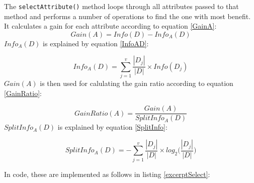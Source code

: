 \documentclass{article}
\begin{document}
    The \verb|selectAttribute()| method loops through all attributes passed to that method and performs a number of operations to find the one with most benefit. It calculates a gain for each attribute according to equation \ref{GainA}:
    \begin{equation} \label{GainA}
    Gain(A)=Info(D)-Info_A (D)
    \end{equation}
    $Info_A (D)$ is explained by equation \ref{InfoAD}:

    \begin{equation} \label{InfoAD}
    Info_A (D)=\sum_{j=1}^{v}\frac{|D_j|}{|D|}\times Info(D_j)
    \end{equation}
    $Gain(A)$ is then used for calulating the gain ratio according to equation \ref{GainRatio}:

    \begin{equation} \label{GainRatio}
    GainRatio(A)=\frac{Gain(A)}{SplitInfo_A (D)}
    \end{equation}
    $SplitInfo_A (D)$ is explained by equation \ref{SplitInfo}:

    \begin{equation} \label{SplitInfo}
    SplitInfo_A (D)=-\sum_{j=1}^{v}\frac{|D_j|}{|D|} \times log_2\bigg( \frac{|D_j|}{|D|}\bigg)
    \end{equation}

    In code, these are implemented as follows in listing \ref{excerptSelect}:
\end{document}
